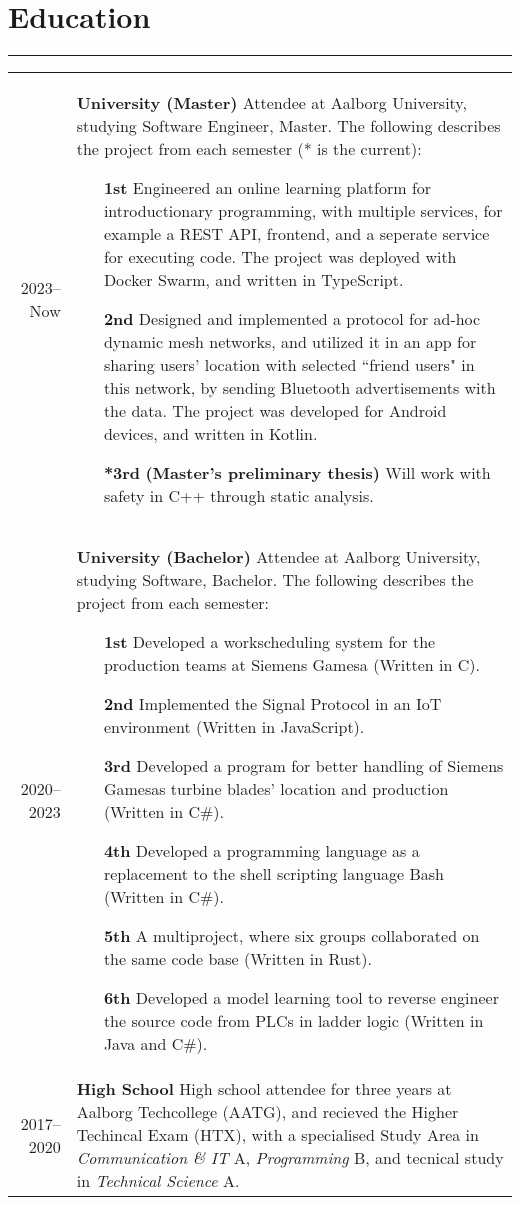 \documentclass[a4paper]{report}
\def\secsep{\hrule width5cm}
\begin{document}
\newcommand{\p}[1]{\textbf{#1}\mbox{}\newline}
\def\n{\\\\}
\section*{Education}
\secsep
\begin{longtabu} to \textwidth {r|X}
    2023--Now & \p{University (Master)}
    Attendee at Aalborg University, studying Software Engineer, Master. The following describes the project from each semester (* is the current):
    \begin{itemize}[leftmargin=4em]
        \item[\textbf{1st}] Engineered an online learning platform for introductionary programming, with multiple services, for example a REST API, frontend, and a seperate service for executing code. The project was deployed with Docker Swarm, and written in TypeScript.
        \item[\textbf{2nd}] Designed and implemented a protocol for ad-hoc dynamic mesh networks, and utilized it in an app for sharing users' location with selected ``friend users" in this network, by sending Bluetooth advertisements with the data. The project was developed for Android devices, and written in Kotlin.
        \item[\textbf{*3rd}] \textbf{(Master's preliminary thesis)} Will work with safety in C++ through static analysis.
    \end{itemize}
    \\
    2020--2023 & \p{University (Bachelor)}
    Attendee at Aalborg University, studying Software, Bachelor. The following describes the project from each semester:
    \begin{itemize}[leftmargin=4em]
        \item[\textbf{1st}] Developed a workscheduling system for the production teams at Siemens Gamesa (Written in C).
        \item[\textbf{2nd}] Implemented the Signal Protocol in an IoT environment (Written in JavaScript).
        \item[\textbf{3rd}] Developed a program for better handling of Siemens Gamesas turbine blades' location and production (Written in C\#).
        \item[\textbf{4th}] Developed a programming language as a replacement to the shell scripting language Bash (Written in C\#).
        \item[\textbf{5th}] A multiproject, where six groups collaborated on the same code base (Written in Rust).
        \item[\textbf{6th}] Developed a model learning tool to reverse engineer the source code from PLCs in ladder logic (Written in Java and C\#).
    \end{itemize}
    \\
    2017--2020 & \p{High School} 
    High school attendee for three years at Aalborg Techcollege (AATG), and recieved the Higher
    Techincal Exam (HTX), with a specialised Study Area in \textit{Communication \& IT} A,
    \textit{Programming} B, and tecnical study in \textit{Technical Science} A.
\end{longtabu}
\end{document}
